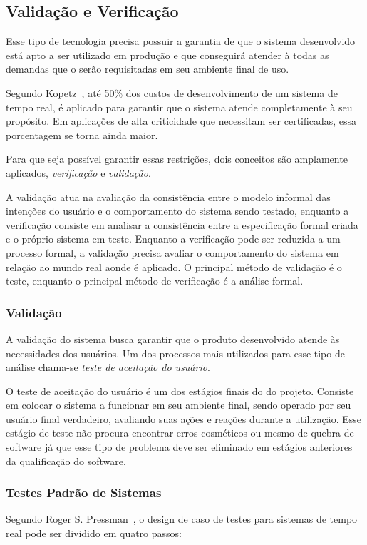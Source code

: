 \subsection{Validação e Verificação}
Esse tipo de tecnologia precisa possuir a garantia de que o sistema desenvolvido está apto a ser utilizado em produção
e que conseguirá atender à todas as demandas que o serão requisitadas em seu ambiente final de uso.

Segundo Kopetz~\cite{Kopetz:1997:RSD:523911}, até 50\% dos custos de desenvolvimento de um sistema de tempo real, é aplicado
para garantir que o sistema atende completamente à seu propósito. Em aplicações de alta criticidade que necessitam ser certificadas,
essa porcentagem se torna ainda maior.

Para que seja possível garantir essas restrições, dois conceitos são amplamente aplicados,
\textit{verificação}  e \textit{validação}.

A validação atua na avaliação da consistência entre o modelo informal das intenções do usuário e
o comportamento do sistema sendo testado, enquanto a verificação consiste em analisar a consistência
entre a especificação formal criada e o próprio sistema em teste. Enquanto a verificação pode ser
reduzida a um processo formal, a validação precisa avaliar o comportamento do sistema em relação ao mundo real
aonde é aplicado. O principal método de validação é o teste, enquanto o principal método de verificação é a
análise formal.

\subsubsection{Validação}
A validação do sistema busca garantir que o produto desenvolvido atende às necessidades dos usuários. Um dos processos
mais utilizados para esse tipo de análise chama-se \textit{teste de aceitação do usuário}.

O teste de aceitação do usuário é um dos estágios finais do do projeto. Consiste em colocar o sistema a funcionar em seu ambiente final,
sendo operado por seu usuário final verdadeiro, avaliando suas ações e reações durante a utilização. Esse estágio de teste
não procura encontrar erros cosméticos ou mesmo de quebra de software já que esse tipo de problema deve ser eliminado em
estágios anteriores da qualificação do software.

\subsubsection{Testes Padrão de Sistemas}
Segundo Roger S. Pressman~\cite{pre_2005}, o design de caso de testes para sistemas de tempo real pode ser dividido
em quatro passos:

